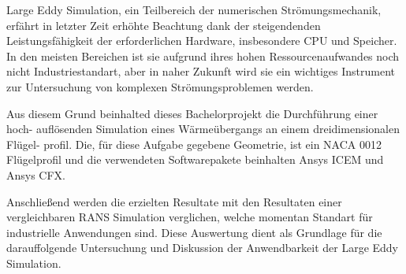 Large Eddy Simulation, ein Teilbereich der numerischen Strömungsmechanik, erfährt in letzter Zeit erhöhte Beachtung dank der steigendenden Leistungsfähigkeit der erforderlichen Hardware, insbesondere CPU und Speicher. In den meisten Bereichen ist sie aufgrund ihres hohen Ressourcenaufwandes noch nicht Industriestandart, aber in naher Zukunft wird sie ein wichtiges Instrument zur Untersuchung von komplexen Str\"omungsproblemen werden.

Aus diesem Grund beinhalted dieses Bachelorprojekt die Durchf\"uhrung einer hoch- aufl\"osenden Simulation eines W\"arme\"ubergangs an einem dreidimensionalen Fl\"ugel- profil. Die, für diese Aufgabe gegebene Geometrie, ist ein NACA 0012 Fl\"ugelprofil und die verwendeten Softwarepakete beinhalten Ansys ICEM und Ansys CFX. 

Anschließend werden die erzielten Resultate mit den Resultaten einer vergleichbaren RANS Simulation verglichen, welche momentan Standart für industrielle Anwendungen sind. Diese Auswertung dient als Grundlage für die darauffolgende Untersuchung und Diskussion der Anwendbarkeit der Large Eddy Simulation.